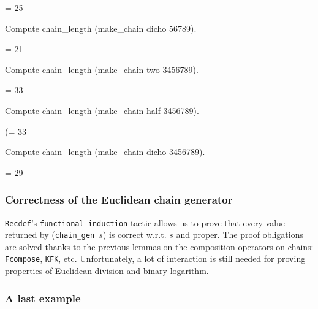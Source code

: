 \begin{Coqanswer}
 = 25%
\end{Coqanswer}

\begin{Coqsrc}
Compute chain_length (make_chain dicho 56789).
\end{Coqsrc}

\begin{Coqanswer}
= 21%
\end{Coqanswer}

\begin{Coqsrc}
Compute chain_length (make_chain two 3456789).
\end{Coqsrc}

\begin{Coqanswer}
= 33%
\end{Coqanswer}

\begin{Coqsrc}
Compute chain_length (make_chain half 3456789).
\end{Coqsrc}

\begin{Coqanswer}
(= 33%
\end{Coqanswer}

\begin{Coqsrc}
Compute chain_length (make_chain dicho 3456789).
\end{Coqsrc}

\begin{Coqanswer}
= 29%
\end{Coqanswer}


\subsubsection{Correctness of the Euclidean chain generator}

\texttt{Recdef}'s \texttt{functional induction} tactic allows us to
prove that every value returned by (\texttt{chain\_gen $s$}) is correct w.r.t. 
\texttt{$s$} and proper.
The proof obligations are solved thanks to the previous lemmas on 
the composition operators on chains: \texttt{Fcompose}, \texttt{KFK}, etc.
Unfortunately, a lot of interaction is still needed for proving properties of
Euclidean division and binary logarithm. 




\subsubsection{A last example}
\label{ex45319}

